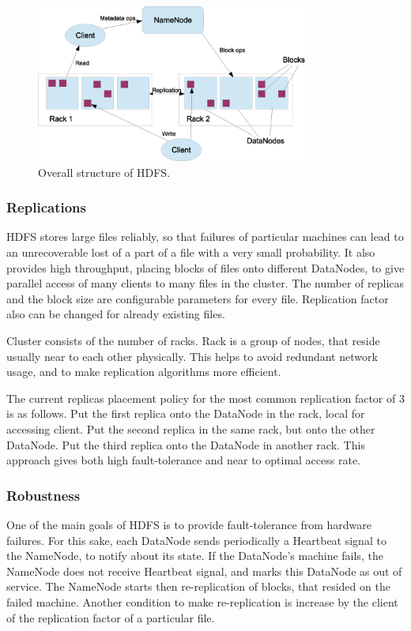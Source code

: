 \begin{figure}[H]
  \centering
  \includegraphics [width=0.8\textwidth]{images/HDFS}
  \caption{Overall structure of HDFS.}
  \label{fig:HDFS}
\end{figure}

\subsubsection{Replications}

HDFS stores large files reliably, so that failures of particular machines can lead to an unrecoverable lost of a part of a file with a very small probability.
It also provides high throughput, placing blocks of files onto different DataNodes, to give parallel access of many clients to many files in the cluster.
The number of replicas and the block size are configurable parameters for every file.
Replication factor also can be changed for already existing files.

Cluster consists of the number of racks.
Rack is a group of nodes, that reside usually near to each other physically.
This helps to avoid redundant network usage, and to make replication algorithms more efficient.

The current replicas placement policy for the most common replication factor of 3 is as follows.
Put the first replica onto the DataNode in the rack, local for accessing client.
Put the second replica in the same rack, but onto the other DataNode.
Put the third replica onto the DataNode in another rack.
This approach gives both high fault-tolerance and near to optimal access rate.

\subsubsection{Robustness}

One of the main goals of HDFS is to provide fault-tolerance from hardware failures.
For this sake, each DataNode sends periodically a Heartbeat signal to the NameNode, to notify about its state.
If the DataNode's machine fails, the NameNode does not receive Heartbeat signal, and marks this DataNode as out of service.
The NameNode starts then re-replication of blocks, that resided on the failed machine.
Another condition to make re-replication is increase by the client of the replication factor of a particular file.

